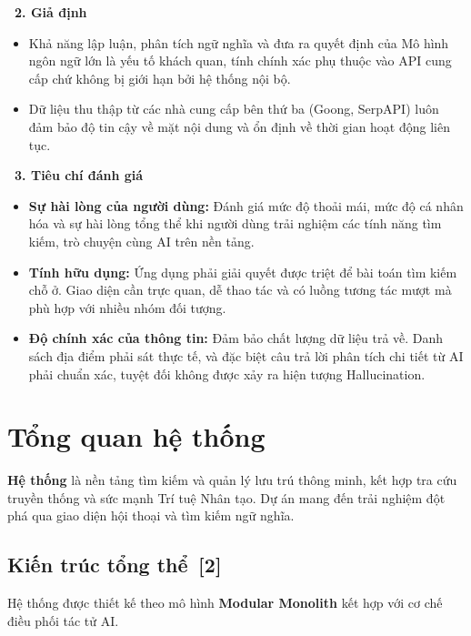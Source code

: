\documentclass[12pt, a4paper]{article}
\begin{document}
\vspace{0.3cm}
\noindent\textbf{\textcolor{blue!80!black}{\faLightbulb \ 2. Giả định}}
\begin{itemize}[label=\textcolor{gray!70!black}{\faCaretRight}]
  \item Khả năng lập luận, phân tích ngữ nghĩa và đưa ra quyết định của Mô hình ngôn ngữ lớn là yếu tố khách quan, tính chính xác phụ thuộc vào API cung cấp chứ không bị giới hạn bởi hệ thống nội bộ.
  \item Dữ liệu thu thập từ các nhà cung cấp bên thứ ba (Goong, SerpAPI) luôn đảm bảo độ tin cậy về mặt nội dung và ổn định về thời gian hoạt động liên tục.
\end{itemize}

\vspace{0.3cm}
\noindent\textbf{\textcolor{blue!80!black}{\faTasks \ 3. Tiêu chí đánh giá}}
\begin{itemize}[label=\textcolor{gray!70!black}{\faCaretRight}]
  \item \textbf{Sự hài lòng của người dùng:} Đánh giá mức độ thoải mái, mức độ cá nhân hóa và sự hài lòng tổng thể khi người dùng trải nghiệm các tính năng tìm kiếm, trò chuyện cùng AI trên nền tảng.
  \item \textbf{Tính hữu dụng:} Ứng dụng phải giải quyết được triệt để bài toán tìm kiếm chỗ ở. Giao diện cần trực quan, dễ thao tác và có luồng tương tác mượt mà phù hợp với nhiều nhóm đối tượng.
  \item \textbf{Độ chính xác của thông tin:} Đảm bảo chất lượng dữ liệu trả về. Danh sách địa điểm phải sát thực tế, và đặc biệt câu trả lời phân tích chi tiết từ AI phải chuẩn xác, tuyệt đối không được xảy ra hiện tượng Hallucination.
\end{itemize}


\section{Tổng quan hệ thống}
\textbf{Hệ thống} là nền tảng tìm kiếm và quản lý lưu trú thông minh, kết hợp tra cứu truyền thống và sức mạnh Trí tuệ Nhân tạo. Dự án mang đến trải nghiệm đột phá qua giao diện hội thoại và tìm kiếm ngữ nghĩa.

\subsection[Kiến trúc tổng thể]{Kiến trúc tổng thể \,{\normalfont\small\textcolor{cyan!70!black}{[2]}}}

\noindent Hệ thống được thiết kế theo mô hình \textbf{Modular Monolith} kết hợp với cơ chế điều phối tác tử AI. 
\end{document}
